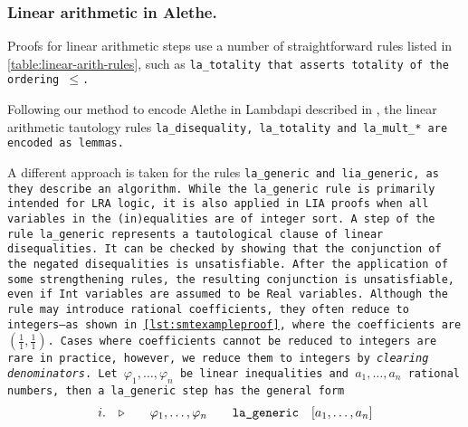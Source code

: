 \subsubsection{Linear arithmetic in Alethe.}
\label{sssect:la-in-alethe}

Proofs for linear arithmetic steps use a number of straightforward rules listed in \cref{table:linear-arith-rules}, such as \tt{la\_totality} that asserts totality of the ordering $\leq$.

Following our method to encode Alethe in Lambdapi described in \cite{ColtellacciMD24}, the linear arithmetic tautology rules \tt{la\_disequality}, \tt{la\_totality} and \tt{la\_mult\_*} are encoded as lemmas.

A different approach is taken for the rules \tt{la\_generic} and \tt{lia\_generic}, as they describe an algorithm.
While the \tt{la\_generic rule} is primarily intended for LRA logic, it is also applied in LIA proofs when all variables in the (in)equalities are of integer sort.
A step of the rule \tt{la\_generic} represents a tautological clause of linear disequalities.  It can be checked by showing that the conjunction of
the negated disequalities is unsatisfiable. After the application of some strengthening rules, the resulting conjunction is unsatisfiable,
even if \lstinline[language=SMT,basicstyle=\ttfamily\footnotesize\upshape]{Int} variables are assumed to be \lstinline[language=SMT,basicstyle=\ttfamily\footnotesize\upshape]{Real} variables.
Although the rule may introduce rational coefficients, they often reduce to integers—as shown in \cref{lst:smtexampleproof}, where the coefficients are $(\frac{1}{1}, \frac{1}{1})$.
Cases where coefficients cannot be reduced to integers are rare in practice, however, we reduce them to integers by \emph{clearing denominators}.
Let $\varphi_1,\dots, \varphi_n$ be linear inequalities and $a_1, \dots, a_n$ rational numbers, then a \tt{la\_generic} step has the general form
%
\[
\begin{matrix*}[c]
  i. & \ctxsep \quad & \varphi_1 , \dots , \varphi_n & \quad \tt{la\_generic}  & [a_1, \dots, a_n] \\
\end{matrix*}
\]

